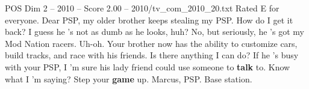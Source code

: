 \begin{textsample}{POS Dim 2 – 2010 – Score 2.00 – 2010/tv\_com\_2010\_20.txt}  \label{ex:f2_pos_042}
Rated E for everyone.
Dear PSP, my older brother keeps stealing my PSP.
How do I get it back?
I guess he 's not as dumb as he looks, huh?
No, but seriously, he 's got my Mod Nation racers.
Uh-oh.
Your brother now has the ability to customize cars, build tracks, and race with his friends.
Is there anything I can do?
If he 's busy with your PSP, I 'm sure his lady friend could use someone to \textbf{talk} to.
Know what I 'm saying?
Step your \textbf{game} up.
Marcus, PSP.
Base station.

\end{textsample}
